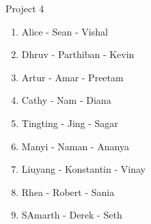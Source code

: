 Project 4
\begin{enumerate}
\item Alice - Sean - Vishal
\item Dhruv - Parthiban - Kevin
\item Artur - Amar - Preetam
\item Cathy - Nam - Diana
\item Tingting - Jing - Sagar
\item Manyi - Naman - Ananya
\item Liuyang - Konstantin - Vinay
\item Rhea - Robert - Sania
\item SAmarth - Derek - Seth
\end{enumerate}
